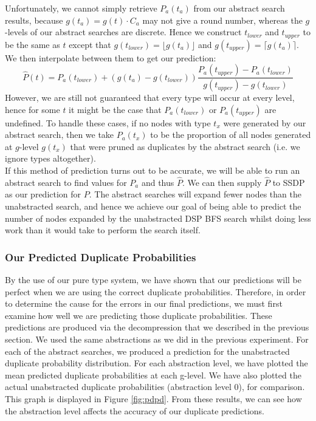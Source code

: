 \documentclass{article}
\begin{document}
 Unfortunately, we cannot simply retrieve \(P_a(t_a)\) from our abstract search results,
 because \(g(t_a) = g(t) \cdot C_a\) may not give a round number, whereas the \(g\)-levels of our abstract searches are discrete.
 Hence we construct \(t_{lower}\) and \(t_{upper}\) to be the same as \(t\) except that
 \(g(t_{lower}) = \lfloor  g(t_a) \rfloor\)
 and \(g(t_{upper}) = \lceil  g(t_a) \rceil\). We then interpolate between them to get our prediction:
 \[\hat{P}(t) =
   P_a(t_{lower}) + (g(t_a) - g(t_{lower})) \frac{P_{a}(t_{upper}) - P_{a}(t_{lower})}{g(t_{upper}) - g(t_{lower})}
 \]
 However, we are still not guaranteed that every type will occur at every level, hence
 for some \(t\) it might be the case that \(P_a(t_{lower})\) or \(P_a(t_{upper})\) are undefined.
 To handle these cases,
 if no nodes with type \(t_{x}\) were generated by our abstract search,
 then we take \(P_a(t_{x})\) to be the proportion of all nodes generated at \(g\)-level \(g(t_{x})\)
 that were pruned as duplicates by the abstract search (i.e. we ignore types altogether). \\

 
 If this method of prediction turns out to be accurate,
 we will be able to run an abstract search to find values for \(P_a\) and thus \(\hat{P}\).
 We can then supply \(\hat{P}\) to SSDP as our prediction for \(P\).
 The abstract searches will expand fewer nodes than the unabstracted search, and
 hence we achieve our goal of being able to predict the number of nodes expanded by the
 unabstracted DSP BFS search whilst doing less work than it would take to perform the search itself.


 
\subsubsection*{Our Predicted Duplicate Probabilities}

By the use of our pure type system,
we have shown that our predictions will be perfect when we are using the correct duplicate probabilities.
Therefore, in order to determine the cause for the errors in our final predictions,
we must first examine how well we are predicting those duplicate probabilities.
These predictions are produced via the decompression that we described in the previous section.
We used the same abstractions as we did in the previous experiment.
For each of the abstract searches,
we produced a prediction for the unabstracted duplicate probability distribution.
For each abstraction level, we have plotted the mean predicted duplicate probabilities at each g-level.
We have also plotted the actual unabstracted duplicate probabilities (abstraction level 0), for comparison.
This graph is displayed in Figure \ref{fig:pdpd}.
From these results, we can see how the abstraction level affects the accuracy of our duplicate predictions. \\
\end{document}
